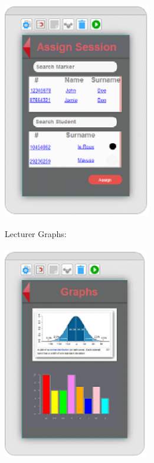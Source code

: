 \documentclass{article}
\begin{document}
\includegraphics*[width=2.55in, height=3.78in, keepaspectratio=false]{image32}  







Lecturer Graphs:

\includegraphics*[width=2.51in, height=3.73in, keepaspectratio=false]{image33}
\end{document}
